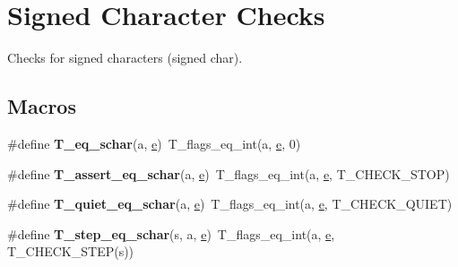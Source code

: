 \hypertarget{group__RTEMSTestFrameworkChecksSChar}{}\section{Signed Character Checks}
\label{group__RTEMSTestFrameworkChecksSChar}


Checks for signed characters (signed char).  


\subsection*{Macros}
\begin{DoxyCompactItemize}
\item 
\mbox{\label{group__RTEMSTestFrameworkChecksSChar_ga5ae617f60b7e053eb97ba7db020f848b}} 
\#define {\bfseries T\+\_\+eq\+\_\+schar}(a,  \mbox{\hyperlink{sun4u_2tte_8h_a8b0b9ed08e0e18920ec2682f48228c27}{e}})~T\+\_\+flags\+\_\+eq\+\_\+int(a, \mbox{\hyperlink{sun4u_2tte_8h_a8b0b9ed08e0e18920ec2682f48228c27}{e}}, 0)
\item 
\mbox{\label{group__RTEMSTestFrameworkChecksSChar_ga92159a09d80c68070f42780674ac86da}} 
\#define {\bfseries T\+\_\+assert\+\_\+eq\+\_\+schar}(a,  \mbox{\hyperlink{sun4u_2tte_8h_a8b0b9ed08e0e18920ec2682f48228c27}{e}})~T\+\_\+flags\+\_\+eq\+\_\+int(a, \mbox{\hyperlink{sun4u_2tte_8h_a8b0b9ed08e0e18920ec2682f48228c27}{e}}, T\+\_\+\+C\+H\+E\+C\+K\+\_\+\+S\+T\+OP)
\item 
\mbox{\label{group__RTEMSTestFrameworkChecksSChar_ga4f257f4e82856e3db74625bbd62df05f}} 
\#define {\bfseries T\+\_\+quiet\+\_\+eq\+\_\+schar}(a,  \mbox{\hyperlink{sun4u_2tte_8h_a8b0b9ed08e0e18920ec2682f48228c27}{e}})~T\+\_\+flags\+\_\+eq\+\_\+int(a, \mbox{\hyperlink{sun4u_2tte_8h_a8b0b9ed08e0e18920ec2682f48228c27}{e}}, T\+\_\+\+C\+H\+E\+C\+K\+\_\+\+Q\+U\+I\+ET)
\item 
\mbox{\label{group__RTEMSTestFrameworkChecksSChar_ga30575582e78ca98a15b0687ab58d4417}} 
\#define {\bfseries T\+\_\+step\+\_\+eq\+\_\+schar}(s,  a,  \mbox{\hyperlink{sun4u_2tte_8h_a8b0b9ed08e0e18920ec2682f48228c27}{e}})~T\+\_\+flags\+\_\+eq\+\_\+int(a, \mbox{\hyperlink{sun4u_2tte_8h_a8b0b9ed08e0e18920ec2682f48228c27}{e}}, T\+\_\+\+C\+H\+E\+C\+K\+\_\+\+S\+T\+EP(s))

\end{DoxyCompactItemize}
